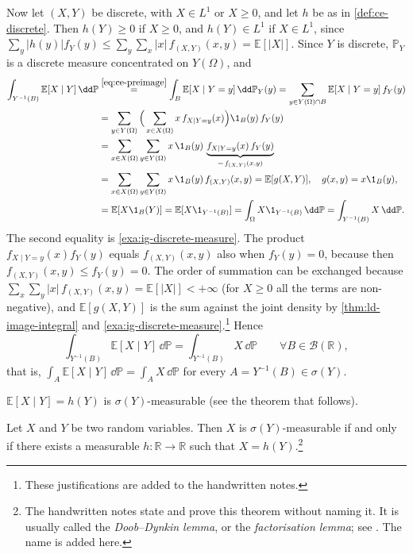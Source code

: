 \begin{remark}
Now let $(X,Y)$ be discrete, with $X\in L^1$ or $X\ge0$, and let $h$ be as in
\cref{def:ce-discrete}. Then $h(Y)\ge0$ if $X\ge0$, and $h(Y)\in L^1$ if $X\in L^1$, since
$\sum_y|h(y)|f_Y(y)\le\sum_y\sum_x|x|\,f_{(X,Y)}(x,y)=\mathbb E[|X|]$. Since $Y$ is discrete,
$\mathbb P_Y$ is a discrete measure concentrated on $Y(\Omega)$, and
\[
\begin{aligned}
  \int_{Y^{-1}(B)}\mathbb E[X\mid Y]\,\dd\mathbb P
  &\overset{\eqref{eq:ce-preimage}}{=}\int_B\mathbb E[X\mid Y=y]\,\dd\mathbb P_Y(y)
   =\sum_{y\in Y(\Omega)\cap B}\mathbb E[X\mid Y=y]\,f_Y(y)\\
  &=\sum_{y\in Y(\Omega)}\Big(\sum_{x\in X(\Omega)}x\,f_{X\mid Y=y}(x)\Big)\1_B(y)\,f_Y(y)\\
  &=\sum_{x\in X(\Omega)}\sum_{y\in Y(\Omega)}x\,\1_B(y)\,\underbrace{f_{X\mid Y=y}(x)\,f_Y(y)}_{=\,f_{(X,Y)}(x,y)}\\
  &=\sum_{x\in X(\Omega)}\sum_{y\in Y(\Omega)}x\,\1_B(y)\,f_{(X,Y)}(x,y)
   =\mathbb E[g(X,Y)],\quad g(x,y)=x\1_B(y),\\
  &=\mathbb E[X\1_B(Y)]=\mathbb E[X\1_{Y^{-1}(B)}]=\int_\Omega X\1_{Y^{-1}(B)}\,\dd\mathbb P
   =\int_{Y^{-1}(B)}X\,\dd\mathbb P .
\end{aligned}
\]
The second equality is \cref{exa:ig-discrete-measure}. The product
$f_{X\mid Y=y}(x)f_Y(y)$ equals $f_{(X,Y)}(x,y)$ also when $f_Y(y)=0$, because then
$f_{(X,Y)}(x,y)\le f_Y(y)=0$. The order of summation can be exchanged because
$\sum_x\sum_y|x|\,f_{(X,Y)}(x,y)=\mathbb E[|X|]<+\infty$ (for $X\ge0$ all the terms are
non-negative), and $\mathbb E[g(X,Y)]$ is the sum against the joint density by
\cref{thm:ld-image-integral} and \cref{exa:ig-discrete-measure}.\footnote{These
justifications are added to the handwritten notes.} Hence
\begin{equation}\label{eq:ce-discrete-property}
  \int_{Y^{-1}(B)}\mathbb E[X\mid Y]\,\dd\mathbb P=\int_{Y^{-1}(B)}X\,\dd\mathbb P
  \qquad\forall B\in\mathcal B(\mathbb R),
\end{equation}
that is, $\int_A\mathbb E[X\mid Y]\,\dd\mathbb P=\int_AX\,\dd\mathbb P$ for every
$A=Y^{-1}(B)\in\sigma(Y)$.
\end{remark}

\begin{remark}\label{rem:ce-measurable}
$\mathbb E[X\mid Y]=h(Y)$ is $\sigma(Y)$-measurable (see the theorem that follows).
\end{remark}

\begin{theorem}\label{thm:ce-doob-dynkin}
Let $X$ and $Y$ be two random variables. Then $X$ is $\sigma(Y)$-measurable if and only if
there exists a measurable $h:\mathbb R\to\mathbb R$ such that $X=h(Y)$.\footnote{The handwritten
notes state and prove this theorem without naming it. It is usually called the
\emph{Doob--Dynkin lemma}, or the \emph{factorisation lemma}; see \citet[Section~20]{billingsley}.
The name is added here.}
\end{theorem}

